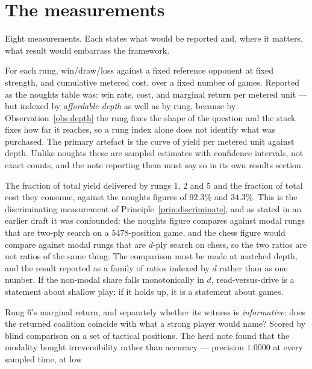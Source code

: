 \documentclass[11pt,a4paper]{article}
\theoremstyle{plain}
\theoremstyle{definition}
\theoremstyle{remark}
\begin{document}
\section{The measurements}
\label{sec:measure}

Eight measurements. Each states what would be reported and, where it matters,
what result would embarrass the framework.

\begin{description}[leftmargin=2.4em,style=nextline]
\item[M1 --- the yield ladder, against depth.] For each rung, win/draw/loss
against a fixed reference opponent at fixed strength, and cumulative metered
cost, over a fixed number of games. Reported as the noughts table was: win rate,
cost, and marginal return per metered unit --- but indexed by \emph{affordable
depth} as well as by rung, because by Observation~\ref{obs:depth} the rung fixes
the shape of the question and the stack fixes how far it reaches, so a rung
index alone does not identify what was purchased. The primary artefact is the
curve of yield per metered unit against depth. Unlike noughts these are sampled
estimates with confidence intervals, not exact counts, and the note reporting
them must say so in its own results section.
\item[M2 --- non-modal share, deconfounded.] The fraction of total yield
delivered by rungs 1, 2 and 5 and the fraction of total cost they consume,
against the noughts figures of $92.3\%$ and $34.3\%$. This is the discriminating
measurement of Principle~\ref{prin:discriminate}, and as stated in an earlier
draft it was confounded: the noughts figure compares against modal rungs that
are two-ply search on a $5478$-position game, and the chess figure would compare
against modal rungs that are $d$-ply search on chess, so the two ratios are not
ratios of the same thing. The comparison must be made at matched depth, and the
result reported as a family of ratios indexed by $d$ rather than as one number.
If the non-modal share falls monotonically in $d$, read-versus-drive is a
statement about shallow play; if it holds up, it is a statement about games.
\item[M3 --- the coalition rung.] Rung 6's marginal return, and separately
whether its witness is \emph{informative}: does the returned coalition coincide
with what a strong player would name? Scored by blind comparison on a set of
tactical positions. The herd note found that the modality bought irreversibility
rather than accuracy --- precision $1.0000$ at every sampled time, at low

\end{description}
\end{document}
